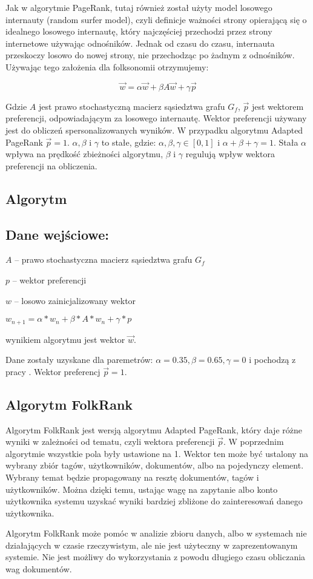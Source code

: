 Jak w algorytmie PageRank, tutaj również został użyty model losowego internauty (random surfer model), czyli definicje ważności strony opierającą się o idealnego losowego internautę, który najczęściej przechodzi przez strony internetowe używając odnośników. Jednak od czasu do czasu, internauta przeskoczy losowo do nowej strony, nie przechodząc po żadnym z odnośników. Używając tego założenia dla folksonomii otrzymujemy:

\begin{equation}
  \vec{w} = \alpha  \vec{w} + \beta A  \vec{w} + \gamma \vec{p}
\end{equation}

Gdzie $A$ jest prawo stochastyczną macierz sąsiedztwa grafu $G_f$, $\vec{p}$ jest wektorem preferencji, odpowiadającym za losowego internautę. Wektor preferencji używany jest do obliczeń spersonalizowanych wyników. W przypadku algorytmu Adapted PageRank $\vec{p}=1$. $\alpha, \beta$ i $\gamma$ to stałe, gdzie: $\alpha, \beta, \gamma \in [0,1]$ i $\alpha + \beta + \gamma = 1$. Stała  $\alpha$ wpływa na prędkość zbieżności algorytmu, $\beta$ i $\gamma$ regulują wpływ wektora preferencji na obliczenia. 


\subsection{Algorytm}
\subsection*{Dane wejściowe:}
$A$ -- prawo stochastyczna macierz sąsiedztwa grafu $G_f$

$p$ -- wektor preferencji

$w$ -- losowo zainicjalizowany wektor

\begin{center}
\begin{algorithmic}
\REPEAT
\STATE $w_{n+1} = \alpha * w_n + \beta * A * w_n + \gamma * p$

\end{algorithmic}
\end{center}

wynikiem algorytmu jest wektor $\vec{w}$.

Dane zostały uzyskane dla paremetrów: $\alpha = 0.35, \beta = 0.65, \gamma = 0$ i pochodzą z pracy \cite{hotho2006information}. Wektor preferencj  $\vec{p} = 1$.

\subsection{Algorytm FolkRank}
Algorytm FolkRank jest wersją algorytmu Adapted PageRank, który daje różne wyniki w zależności od tematu, czyli wektora preferencji $\vec{p}$. W poprzednim algorytmie wszystkie pola były ustawione na 1. Wektor ten może być ustalony na wybrany zbiór tagów, użytkowników, dokumentów, albo na pojedynczy element. Wybrany temat będzie propagowany na resztę dokumentów, tagów i użytkowników. Można dzięki temu, ustając wagę na zapytanie albo konto użytkownika systemu uzyskać wyniki bardziej zbliżone do zainteresowań danego użytkownika.

Algorytm FolkRank może pomóc w analizie zbioru danych, albo w systemach nie działających w czasie rzeczywistym, ale nie jest użyteczny w zaprezentowanym systemie. Nie jest możliwy do wykorzystania z powodu długiego czasu obliczania wag dokumentów.




